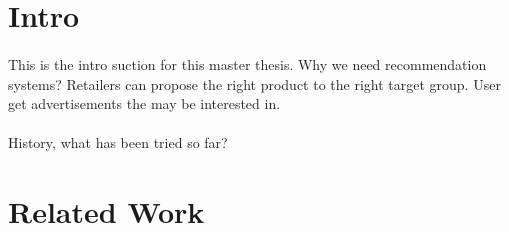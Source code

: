 \section{Intro}
\paragraph{} This is the intro suction for this master thesis.
Why we need recommendation systems? Retailers can propose the right product to the right target group.
User get advertisements the may be interested in.\cite{RecommenderSystems:2}

\paragraph{}
History, what has been tried so far?

\section{Related Work}